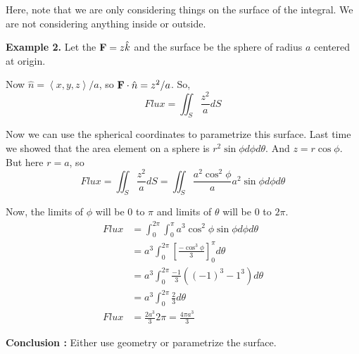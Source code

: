 Here, note that we are only considering things on the surface of the integral. 
We are not considering anything inside or outside.


{\bf Example 2.} Let the ${\bf F} = z \hat{k}$ and the surface be the sphere of radius $a$ centered at origin.

Now $\hat{n} = \left<x, y, z \right> / a$, so ${\bf F} \cdot \hat{n} = z^2 / a$. So, 
$$
Flux = \iint_S \frac{z^2}{a} dS
$$

Now we can use the spherical coordinates to parametrize this surface.
Last time we showed that the area element on a sphere is $r^2 \sin \phi d\phi d\theta$.
And $z = r \cos \phi$. But here $r = a$, so
$$
Flux = \iint_S \frac{z^2}{a} dS = \iint_S \frac{a^2 \cos^2 \phi}{a} a^2 \sin \phi d\phi d\theta
$$

Now, the limits of $\phi$ will be $0$ to $\pi$ and limits of $\theta$ will be $0$ to $2 \pi$.
\begin{align*}
Flux & = \int_0^{2\pi} \int_0^{\pi} a^3 \cos^2 \phi \sin \phi d\phi d\theta \\
    & = a^3 \int_0^{2\pi} \left[ \frac{-\cos^3 \phi}{3} \right]_0^{\pi} d\theta \\
    & = a^3 \int_0^{2\pi} \frac{-1}{3} ((-1)^3 - 1^3) d\theta \\
    & = a^3 \int_0^{2\pi} \frac{2}{3} d\theta \\
Flux & = \frac{2a^3}{3} 2 \pi = \frac{4 \pi a^3}{3} 
\end{align*}


{\bf Conclusion : } Either use geometry or parametrize the surface.
